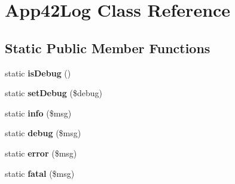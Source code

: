 \hypertarget{class_app42_log}{\section{App42\+Log Class Reference}
\label{class_app42_log}
}
\subsection*{Static Public Member Functions}
\begin{DoxyCompactItemize}
\item 
\hypertarget{class_app42_log_a8002f7699e4d9352ddefb8613fe11d15}{static {\bfseries is\+Debug} ()}\label{class_app42_log_a8002f7699e4d9352ddefb8613fe11d15}

\item 
\hypertarget{class_app42_log_aae5fb476445cbb3a16f3432b22f5abf4}{static {\bfseries set\+Debug} (\$debug)}\label{class_app42_log_aae5fb476445cbb3a16f3432b22f5abf4}

\item 
\hypertarget{class_app42_log_aeec13bdc86154c5a25384a40f7485075}{static {\bfseries info} (\$msg)}\label{class_app42_log_aeec13bdc86154c5a25384a40f7485075}

\item 
\hypertarget{class_app42_log_ae8b3566574ed36b500a4e3693e67833b}{static {\bfseries debug} (\$msg)}\label{class_app42_log_ae8b3566574ed36b500a4e3693e67833b}

\item 
\hypertarget{class_app42_log_ac19c4289d1c6d3e161ab92636b5d18be}{static {\bfseries error} (\$msg)}\label{class_app42_log_ac19c4289d1c6d3e161ab92636b5d18be}

\item 
\hypertarget{class_app42_log_a8ca514c43a9307e79b597e646f26f7ed}{static {\bfseries fatal} (\$msg)}\label{class_app42_log_a8ca514c43a9307e79b597e646f26f7ed}

\end{DoxyCompactItemize}
